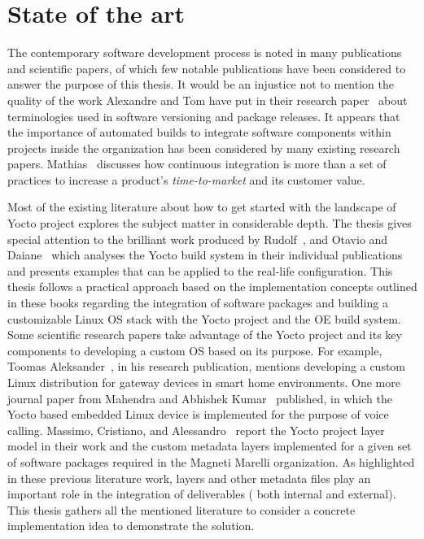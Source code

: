 
\section{State of the art}

The contemporary software development process is noted in many publications and scientific papers, of which few notable publications have been considered to answer the purpose of this thesis. It would be an injustice not to mention the quality of the work Alexandre and Tom have put in their research paper~\parencite{8721084} about terminologies used in software versioning and package releases. It appears that the importance of automated builds to integrate software components within projects inside the organization has been considered by many existing research papers. Mathias~\parencite{6802994} discusses how continuous integration is more than a set of practices to increase a product's \emph{time-to-market} and its customer value.




Most of the existing literature about how to get started with the landscape of Yocto project explores the subject matter in considerable depth. The thesis gives special attention to the brilliant work produced by Rudolf~\parencite{Reference1}, and Otavio and Daiane~\parencite{salvador2014embedded} which analyses the Yocto build system in their individual publications and presents examples that can be applied to the real-life configuration. This thesis follows a practical approach based on the implementation concepts outlined in these books regarding the integration of software packages and building a customizable Linux OS stack with the Yocto project and the \ac{OE} build system. Some scientific research papers take advantage of the Yocto project and its key components to developing a custom OS based on its purpose. For example, Toomas Aleksander~\parencite{veromannembedded}, in his research publication, mentions developing a custom Linux distribution for gateway devices in smart home environments. One more journal paper from Mahendra and Abhishek Kumar~\parencite{swain2015design} published, in which the Yocto based embedded Linux device is implemented for the purpose of voice calling. Massimo, Cristiano, and Alessandro~\parencite{violanteembedded} report the Yocto project layer model in their work and the custom metadata layers implemented for a given set of software packages required in the Magneti Marelli organization. As highlighted in these previous literature work, layers and other metadata files play an important role in the integration of deliverables ( both internal and external). This thesis gathers all the mentioned literature to consider a concrete implementation idea to demonstrate the solution.



